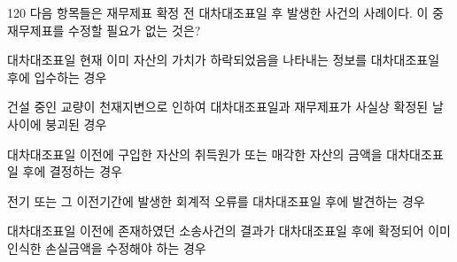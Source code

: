 \begin{question}{120}
다음 항목들은 재무제표 확정 전 대차대조표일 후 발생한 사건의 사례이다. 이 중 재무제표를 수정할 필요가 없는 것은?
\begin{choices}
  \item 대차대조표일 현재 이미 자산의 가치가 하락되었음을 나타내는 정보를 대차대조표일 후에 입수하는 경우
  \item 건설 중인 교량이 천재지변으로 인하여 대차대조표일과 재무제표가 사실상 확정된 날 사이에 붕괴된 경우
  \item 대차대조표일 이전에 구입한 자산의 취득원가 또는 매각한 자산의 금액을 대차대조표일 후에 결정하는 경우
  \item 전기 또는 그 이전기간에 발생한 회계적 오류를 대차대조표일 후에 발견하는 경우
  \item 대차대조표일 이전에 존재하였던 소송사건의 결과가 대차대조표일 후에 확정되어 이미 인식한 손실금액을 수정해야 하는 경우
\end{choices}
\end{question}
